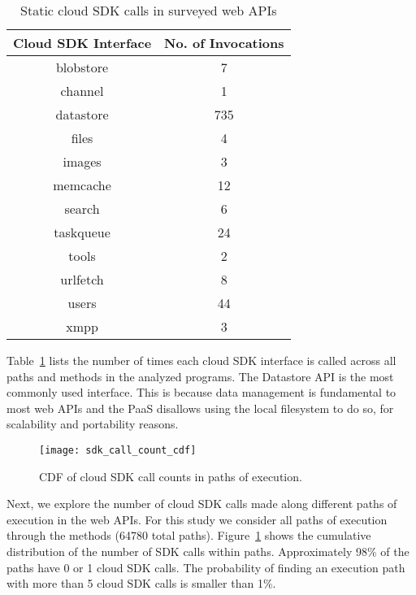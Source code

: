 \begin{table}[htdp]
\caption{Static cloud SDK calls in surveyed web APIs
\label{tab:sdk_call_counts}
}
\begin{center}
\begin{tabular}{|c|c|}
\hline
Cloud SDK Interface & No. of Invocations \\ \hline
blobstore & 7 \\ \hline
channel & 1 \\ \hline
datastore & 735 \\ \hline
files & 4 \\ \hline
images & 3 \\ \hline
memcache & 12 \\ \hline
search & 6 \\ \hline
taskqueue & 24 \\ \hline
tools & 2 \\ \hline
urlfetch & 8 \\ \hline
users & 44 \\ \hline
xmpp & 3 \\ \hline
\end{tabular}
\end{center}
\vspace{-0.2in}
\end{table}

Table~\ref{tab:sdk_call_counts} lists the number of times each cloud 
SDK interface is called across all paths and methods in the analyzed programs.
The Datastore API is the most commonly used interface.
This is because data management is fundamental 
to most web APIs and the PaaS
disallows using the local filesystem to do so,
for scalability and portability reasons.

\begin{figure}
\centering
\texttt{[image: sdk\_call\_count\_cdf]}
\caption{CDF of cloud SDK call counts in paths of execution.
\label{fig:sdk_call_count_cdf}
}
\vspace{-0.2in}
\end{figure}

Next, we explore the number of cloud SDK calls made along 
different paths of execution in the web APIs. For this study
we consider all paths of execution through the methods (64780 total paths). 
Figure~\ref{fig:sdk_call_count_cdf}
shows the cumulative distribution of the number of SDK calls within paths.
Approximately 98\% of the paths have 0 or 1 cloud SDK calls. 
The probability of finding an execution path with more than
5 cloud SDK calls is smaller than 1\%.

